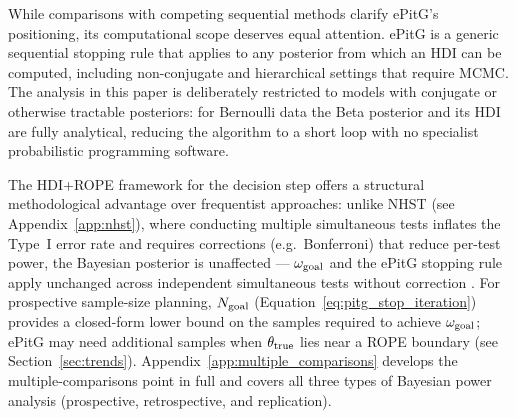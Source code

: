 While comparisons with competing sequential methods clarify ePitG's positioning,
its computational scope deserves equal attention.
ePitG is a generic sequential stopping rule that applies to any posterior from which
an HDI can be computed, including non-conjugate and hierarchical settings that require
MCMC.
The analysis in this paper is deliberately restricted to models with conjugate or
otherwise tractable posteriors: for Bernoulli data the Beta posterior and its HDI are
fully analytical, reducing the algorithm to a short loop with no specialist
probabilistic programming software.

The HDI+ROPE framework for the decision step offers a structural
methodological advantage over frequentist approaches: unlike NHST
(see Appendix~\ref{app:nhst}), where conducting
multiple simultaneous tests inflates the Type~I error rate and requires corrections
(e.g.\ Bonferroni) that reduce per-test power, the Bayesian posterior is unaffected ---
$\omega_{\rm goal}$ and the ePitG stopping rule apply unchanged across independent
simultaneous tests without correction \citep{gelman2012, kruschke2015doing}.
For prospective sample-size planning, $N_{\rm goal}$
(Equation~\ref{eq:pitg_stop_iteration}) provides a closed-form lower bound on the
samples required to achieve $\omega_{\rm goal}$; ePitG may need additional samples
when $\theta_{\rm true}$ lies near a ROPE boundary (see Section~\ref{sec:trends}).
Appendix~\ref{app:multiple_comparisons} develops the multiple-comparisons point in
full and covers all three types of Bayesian power analysis (prospective, retrospective,
and replication).

